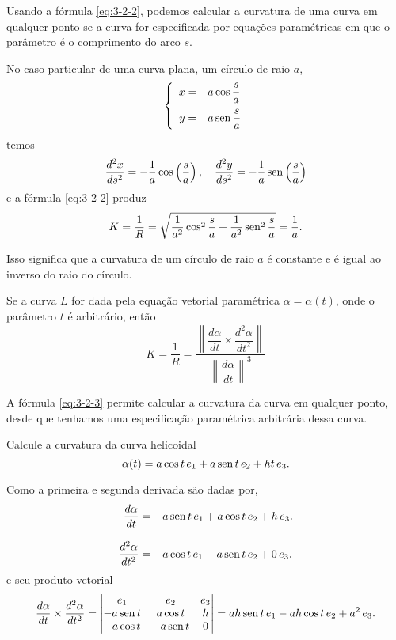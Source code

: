 Usando a fórmula \eqref{eq:3-2-2}, podemos calcular a curvatura de uma curva em qualquer
ponto se a curva for especificada por equações paramétricas em
que o parâmetro é o comprimento do arco \(s\).

No caso particular de uma curva plana, um círculo de raio \(a\),
\begin{equation*}
\left\{
\begin{array}{cl}
x = & a \cos \dfrac{s}{a}\\[2ex]
y =& a \operatorname{sen} \dfrac{s}{a}
\end{array}
\right.
\end{equation*}
temos
\begin{equation*}
\dfrac{d^{2}x}{ds^{2}}=-\dfrac{1}{a}\cos\left(\dfrac{s}{a}\right), \quad
\dfrac{d^{2}y}{ds^{2}}=-\dfrac{1}{a}\operatorname{sen} \left(\dfrac{s}{a}\right)
\end{equation*}
e a fórmula \eqref{eq:3-2-2} produz
\begin{equation*}
K=\dfrac{1}{R}=\sqrt{\dfrac{1}{a^{2}}\cos^{2} \frac{s}{a}+ 
\dfrac{1}{a^{2}}\operatorname{sen}^{2} \frac{s}{a}}= \dfrac{1}{a}.
\end{equation*}

Isso significa que a curvatura de um círculo de raio \(a\) é constante e é igual ao inverso do 
raio do círculo.

Se a curva \(L\) for dada pela equação vetorial paramétrica \(\alpha=\alpha(t)\), onde o parâmetro \(t\) é arbitrário, então
\begin{equation}\label{eq:3-2-3}
K = \dfrac{1}{R}=\dfrac{\left\|\dfrac{d\alpha}{dt}\times \dfrac{d^{2}\alpha}{dt^{2}} \right\|}{\left\|\dfrac{d\alpha}{dt}\right\|^{3}}
\end{equation}

A fórmula \eqref{eq:3-2-3} permite calcular a curvatura da curva em qualquer ponto, desde que tenhamos uma especificação paramétrica arbitrária dessa curva.

\begin{exc}
Calcule a curvatura da curva helicoidal
\begin{equation*}
\alpha(t) = a\cos t\,e_{1} + a\operatorname{sen} t\, e_{2} + ht\, e_{3}.
\end{equation*}
\end{exc}

\solo Como a primeira e segunda derivada são dadas por,
\begin{align*}
\dfrac{d\alpha}{dt}&=  -a\operatorname{sen} t\,e_{1} + a\cos t\, e_{2} + h\, e_{3}.\\[2ex]
\dfrac{d^{2}\alpha}{dt^{2}}&= -a\cos t\,e_{1} - a\operatorname{sen} t\, e_{2} + 0\, e_{3}.
\end{align*}
e seu produto vetorial
\begin{equation*}
\dfrac{d\alpha}{dt}\times \dfrac{d^{2}\alpha}{dt^{2}}=
\begin{vmatrix}
e_{1} & e_{2} & e_{3}\\
-a\operatorname{sen} t& a\cos t & h\\
-a\cos t& -a\operatorname{sen} t & 0
\end{vmatrix}=ah\operatorname{sen} t\, e_{1}-ah\cos t\,e_{2}+a^{2}\,e_{3}.
\end{equation*}

